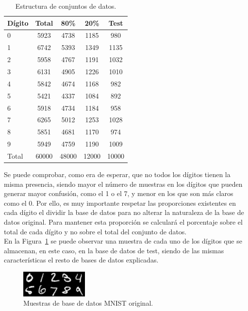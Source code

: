 \begin{table}[H]
	\centering
	\begin{tabular}{|l|c|c|c|c|}
		\hline
		\textbf{Dígito} & \textbf{Total} & \textbf{80\%} & \textbf{20\%} & \textbf{Test}\\
		\hline \hline
		0 & 5923 & 4738 & 1185 & 980\\ \hline
		1 & 6742 & 5393 & 1349 & 1135\\ \hline
		2 & 5958 & 4767 & 1191 & 1032\\ \hline
		3 & 6131 & 4905 & 1226 & 1010\\ \hline
		4 & 5842 & 4674 & 1168 & 982\\ \hline
		5 & 5421 & 4337 & 1084 & 892\\ \hline
		6 & 5918 & 4734 & 1184 & 958\\ \hline
		7 & 6265 & 5012 & 1253 & 1028\\ \hline
		8 & 5851 & 4681 & 1170 & 974\\ \hline
		9 & 5949 & 4759 & 1190 & 1009\\ \hline
		Total & 60000 & 48000 & 12000 & 10000\\ \hline
	\end{tabular}
	\caption{Estructura de conjuntos de datos.}
	\label{tab.baseDatos}
\end{table}

Se puede comprobar, como era de esperar, que no todos los dígitos tienen la misma presencia, siendo mayor el número de muestras en los dígitos que pueden generar mayor confusión, como el 1 o el 7, y menor en los que son más claros como el 0. Por ello, es muy importante respetar las proporciones existentes en cada dígito el dividir la base de datos para no alterar la naturaleza de la base de datos original. Para mantener esta proporción se calculará el porcentaje sobre el total de cada dígito y no sobre el total del conjunto de datos.\\

En la Figura~\ref{fig.digitosMNIST} se puede observar una muestra de cada uno de los dígitos que se almacenan, en este caso, en la base de datos de test, siendo de las mismas características el resto de bases de datos explicadas.

\begin{figure}[H]
	\begin{center}
		\includegraphics[width=0.3\textwidth]{figures/original}
		\caption{Muestras de base de datos MNIST original.}
		\label{fig.digitosMNIST}
	\end{center}
\end{figure}

